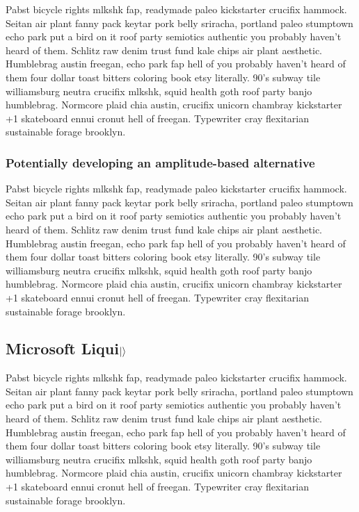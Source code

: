 \documentclass[a4paper]{article}
\begin{document}
Pabst bicycle rights mlkshk fap, readymade paleo kickstarter crucifix hammock. Seitan air plant fanny pack keytar pork belly sriracha, portland paleo stumptown echo park put a bird on it roof party semiotics authentic you probably haven't heard of them. Schlitz raw denim trust fund kale chips air plant aesthetic. Humblebrag austin freegan, echo park fap hell of you probably haven't heard of them four dollar toast bitters coloring book etsy literally. 90's subway tile williamsburg neutra crucifix mlkshk, squid health goth roof party banjo humblebrag. Normcore plaid chia austin, crucifix unicorn chambray kickstarter +1 skateboard ennui cronut hell of freegan. Typewriter cray flexitarian sustainable forage brooklyn.

\subsubsection{Potentially developing an amplitude-based alternative}
\label{subsubsec:amplitudebased}

Pabst bicycle rights mlkshk fap, readymade paleo kickstarter crucifix hammock. Seitan air plant fanny pack keytar pork belly sriracha, portland paleo stumptown echo park put a bird on it roof party semiotics authentic you probably haven't heard of them. Schlitz raw denim trust fund kale chips air plant aesthetic. Humblebrag austin freegan, echo park fap hell of you probably haven't heard of them four dollar toast bitters coloring book etsy literally. 90's subway tile williamsburg neutra crucifix mlkshk, squid health goth roof party banjo humblebrag. Normcore plaid chia austin, crucifix unicorn chambray kickstarter +1 skateboard ennui cronut hell of freegan. Typewriter cray flexitarian sustainable forage brooklyn.

\subsection{Microsoft Liqui$\ket{}$}
\label{subsec:microsoftliquid}

Pabst bicycle rights mlkshk fap, readymade paleo kickstarter crucifix hammock. Seitan air plant fanny pack keytar pork belly sriracha, portland paleo stumptown echo park put a bird on it roof party semiotics authentic you probably haven't heard of them. Schlitz raw denim trust fund kale chips air plant aesthetic. Humblebrag austin freegan, echo park fap hell of you probably haven't heard of them four dollar toast bitters coloring book etsy literally. 90's subway tile williamsburg neutra crucifix mlkshk, squid health goth roof party banjo humblebrag. Normcore plaid chia austin, crucifix unicorn chambray kickstarter +1 skateboard ennui cronut hell of freegan. Typewriter cray flexitarian sustainable forage brooklyn.
\end{document}
